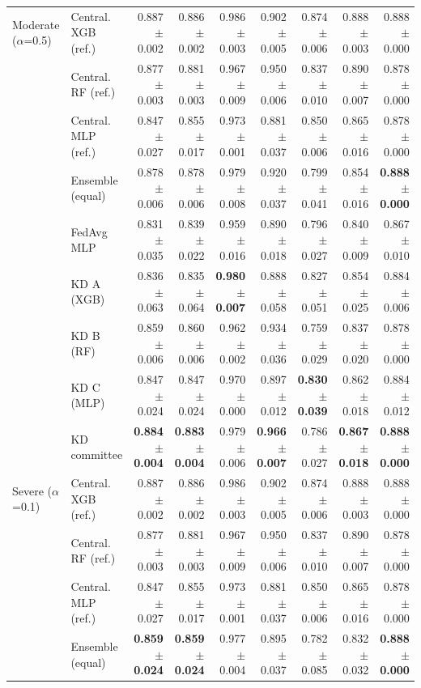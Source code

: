\begin{table}[t]
\begin{tabular}{llrrrrrrr}
\midrule
Moderate ($\alpha$=0.5) & Central. XGB (ref.) & 0.887 $\pm$ 0.002 & 0.886 $\pm$ 0.002 & 0.986 $\pm$ 0.003 & 0.902 $\pm$ 0.005 & 0.874 $\pm$ 0.006 & 0.888 $\pm$ 0.003 & 0.888 $\pm$ 0.000 \\
 & Central. RF (ref.) & 0.877 $\pm$ 0.003 & 0.881 $\pm$ 0.003 & 0.967 $\pm$ 0.009 & 0.950 $\pm$ 0.006 & 0.837 $\pm$ 0.010 & 0.890 $\pm$ 0.007 & 0.878 $\pm$ 0.000 \\
 & Central. MLP (ref.) & 0.847 $\pm$ 0.027 & 0.855 $\pm$ 0.017 & 0.973 $\pm$ 0.001 & 0.881 $\pm$ 0.037 & 0.850 $\pm$ 0.006 & 0.865 $\pm$ 0.016 & 0.878 $\pm$ 0.000 \\
 & Ensemble (equal) & 0.878 $\pm$ 0.006 & 0.878 $\pm$ 0.006 & 0.979 $\pm$ 0.008 & 0.920 $\pm$ 0.037 & 0.799 $\pm$ 0.041 & 0.854 $\pm$ 0.016 & \textbf{0.888 $\pm$ 0.000} \\
 & FedAvg MLP & 0.831 $\pm$ 0.035 & 0.839 $\pm$ 0.022 & 0.959 $\pm$ 0.016 & 0.890 $\pm$ 0.018 & 0.796 $\pm$ 0.027 & 0.840 $\pm$ 0.009 & 0.867 $\pm$ 0.010 \\
 & KD A (XGB) & 0.836 $\pm$ 0.063 & 0.835 $\pm$ 0.064 & \textbf{0.980 $\pm$ 0.007} & 0.888 $\pm$ 0.058 & 0.827 $\pm$ 0.051 & 0.854 $\pm$ 0.025 & 0.884 $\pm$ 0.006 \\
 & KD B (RF) & 0.859 $\pm$ 0.006 & 0.860 $\pm$ 0.006 & 0.962 $\pm$ 0.002 & 0.934 $\pm$ 0.036 & 0.759 $\pm$ 0.029 & 0.837 $\pm$ 0.020 & 0.878 $\pm$ 0.000 \\
 & KD C (MLP) & 0.847 $\pm$ 0.024 & 0.847 $\pm$ 0.024 & 0.970 $\pm$ 0.000 & 0.897 $\pm$ 0.012 & \textbf{0.830 $\pm$ 0.039} & 0.862 $\pm$ 0.018 & 0.884 $\pm$ 0.012 \\
 & KD committee & \textbf{0.884 $\pm$ 0.004} & \textbf{0.883 $\pm$ 0.004} & 0.979 $\pm$ 0.006 & \textbf{0.966 $\pm$ 0.007} & 0.786 $\pm$ 0.027 & \textbf{0.867 $\pm$ 0.018} & \textbf{0.888 $\pm$ 0.000} \\
\midrule
Severe ($\alpha$=0.1) & Central. XGB (ref.) & 0.887 $\pm$ 0.002 & 0.886 $\pm$ 0.002 & 0.986 $\pm$ 0.003 & 0.902 $\pm$ 0.005 & 0.874 $\pm$ 0.006 & 0.888 $\pm$ 0.003 & 0.888 $\pm$ 0.000 \\
 & Central. RF (ref.) & 0.877 $\pm$ 0.003 & 0.881 $\pm$ 0.003 & 0.967 $\pm$ 0.009 & 0.950 $\pm$ 0.006 & 0.837 $\pm$ 0.010 & 0.890 $\pm$ 0.007 & 0.878 $\pm$ 0.000 \\
 & Central. MLP (ref.) & 0.847 $\pm$ 0.027 & 0.855 $\pm$ 0.017 & 0.973 $\pm$ 0.001 & 0.881 $\pm$ 0.037 & 0.850 $\pm$ 0.006 & 0.865 $\pm$ 0.016 & 0.878 $\pm$ 0.000 \\
 & Ensemble (equal) & \textbf{0.859 $\pm$ 0.024} & \textbf{0.859 $\pm$ 0.024} & 0.977 $\pm$ 0.004 & 0.895 $\pm$ 0.037 & 0.782 $\pm$ 0.085 & 0.832 $\pm$ 0.032 & \textbf{0.888 $\pm$ 0.000} \\

\end{tabular}
\end{table}
